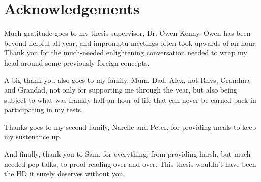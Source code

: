 
\chapter*{Acknowledgements}

%

%
Much gratitude goes to my thesis supervisor, Dr. Owen Kenny. Owen
has been beyond helpful all year, and impromptu meetings often took
upwards of an hour. Thank you for the much-needed enlightening conversation
needed to wrap my head around some previously foreign concepts.

A big thank you also goes to my family, Mum, Dad, Alex, not Rhys,
Grandma and Grandad, not only for supporting me through the year,
but also being subject to what was frankly half an hour of life that
can never be earned back in participating in my tests.

Thanks goes to my second family, Narelle and Peter, for providing
meals to keep my sustenance up.

And finally, thank you to Sam, for everything: from providing harsh,
but much needed pep-talks, to proof reading over and over. This thesis
wouldn't have been the HD it surely deserves without you.
